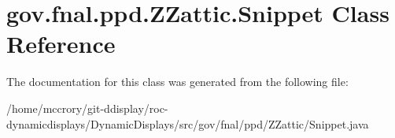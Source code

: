 \hypertarget{classgov_1_1fnal_1_1ppd_1_1ZZattic_1_1Snippet}{\section{gov.\-fnal.\-ppd.\-Z\-Zattic.\-Snippet Class Reference}
\label{classgov_1_1fnal_1_1ppd_1_1ZZattic_1_1Snippet}
}


The documentation for this class was generated from the following file\-:\begin{DoxyCompactItemize}
\item 
/home/mccrory/git-\/ddisplay/roc-\/dynamicdisplays/\-Dynamic\-Displays/src/gov/fnal/ppd/\-Z\-Zattic/Snippet.\-java\end{DoxyCompactItemize}

